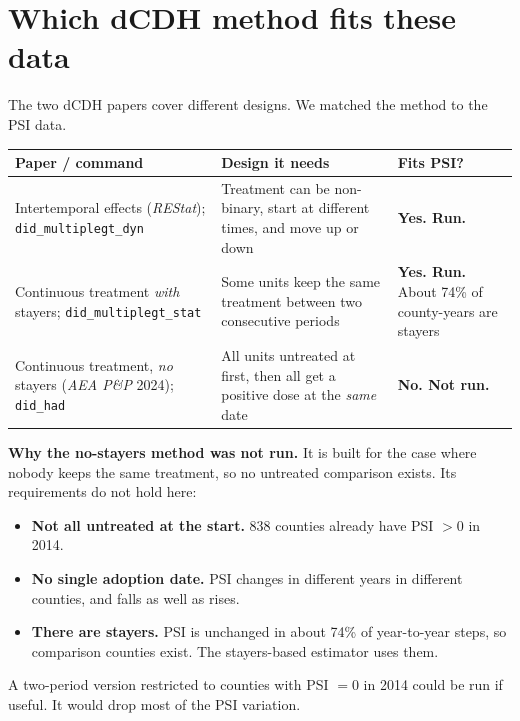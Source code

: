 \documentclass[11pt]{article}
\begin{document}
\section{Which dCDH method fits these data}
The two dCDH papers cover different designs. We matched the method to the PSI data.
\begin{center}\small
\begin{tabular}{>{\raggedright\arraybackslash}p{4.6cm}>{\raggedright\arraybackslash}p{5.2cm}>{\raggedright\arraybackslash}p{4.6cm}}
\toprule
Paper / command & Design it needs & Fits PSI? \\
\midrule
Intertemporal effects (\textit{REStat}); \texttt{did\_multiplegt\_dyn} & Treatment can be non-binary, start at different times, and move up or down & \textbf{Yes. Run.} \\
Continuous treatment \emph{with} stayers; \texttt{did\_multiplegt\_stat} & Some units keep the same treatment between two consecutive periods & \textbf{Yes. Run.} About 74\% of county-years are stayers \\
Continuous treatment, \emph{no} stayers (\textit{AEA P\&P} 2024); \texttt{did\_had} & All units untreated at first, then all get a positive dose at the \emph{same} date & \textbf{No. Not run.} \\
\bottomrule
\end{tabular}
\end{center}
\textbf{Why the no-stayers method was not run.} It is built for the case where nobody keeps the same treatment, so no untreated comparison exists. Its requirements do not hold here:
\begin{itemize}[leftmargin=14pt,itemsep=1pt,topsep=2pt]
\item \textbf{Not all untreated at the start.} 838 counties already have PSI $>0$ in 2014.
\item \textbf{No single adoption date.} PSI changes in different years in different counties, and falls as well as rises.
\item \textbf{There are stayers.} PSI is unchanged in about 74\% of year-to-year steps, so comparison counties exist. The stayers-based estimator uses them.
\end{itemize}
A two-period version restricted to counties with PSI $=0$ in 2014 could be run if useful. It would drop most of the PSI variation.
\end{document}

